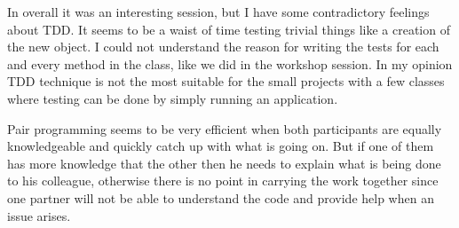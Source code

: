 \documentclass[]{report}
\begin{document}
In overall it was an interesting session, but I have some contradictory feelings about TDD. It seems to be a waist of time testing trivial things like a creation of the new object. I could not understand the reason for writing the tests for each and every method in the class, like we did in the workshop session. In my opinion TDD technique is not the most suitable for the small projects with a few classes where testing can be done by simply running an application. 

Pair programming seems to be very efficient when both participants are equally knowledgeable and quickly catch up with what is going on. But if one of them has more knowledge that the other then he needs to explain what is being done to his colleague, otherwise there is no point in carrying the work together since one partner will not be able to understand the code and provide help when an issue arises.  



\end{document}
